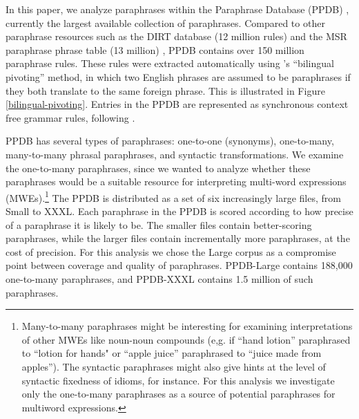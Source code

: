 \documentclass[11pt]{article}
\begin{document}
In this paper, we analyze paraphrases within the Paraphrase Database (PPDB) \cite{ganitkevitch-vandurme-callisonburch:2013:NAACL-HLT}, currently the largest available collection of paraphrases.  Compared to other paraphrase resources such as the DIRT database (12 million rules) \cite{lin2001dirt} and the MSR paraphrase phrase table (13 million) \cite{dolan2004unsupervised}, PPDB contains over 150 million paraphrase rules. These rules were extracted automatically using 's ``bilingual pivoting'' method, in which two English phrases are assumed to be paraphrases if they both translate to the same foreign phrase.  This is illustrated in Figure \ref{bilingual-pivoting}.  Entries in the PPDB are represented as synchronous context free grammar rules, following .

PPDB has several types of paraphrases: one-to-one (synonyms), one-to-many, many-to-many phrasal paraphrases, and syntactic transformations. We examine the one-to-many paraphrases, since we wanted to analyze whether these paraphrases would be a suitable resource for interpreting multi-word expressions (MWEs).\footnote{Many-to-many paraphrases might be interesting for examining interpretations of other MWEs like noun-noun compounds (e,g. if ``hand lotion'' paraphrased  to ``lotion for hands" or ``apple juice'' paraphrased to ``juice made from apples''). The syntactic paraphrases might also give hints at 
the level of syntactic fixedness of idioms, for instance. 
For this analysis we investigate only the one-to-many paraphrases as a source of potential paraphrases for multiword expressions.}
The PPDB is distributed as a set of six increasingly large files, from Small to XXXL. Each paraphrase in the PPDB is scored according to how precise of a paraphrase it is likely to be. The smaller files contain better-scoring paraphrases, while the larger files contain incrementally more paraphrases, at the cost of precision. For this analysis we chose the Large corpus as a compromise point between coverage and quality of paraphrases.  PPDB-Large contains 188,000 one-to-many paraphrases, and PPDB-XXXL contains 1.5 million of such paraphrases. 


\end{document}
